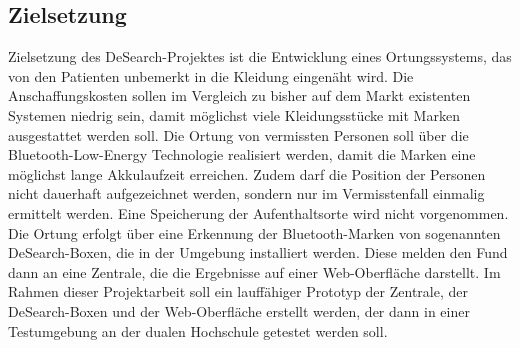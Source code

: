 \subsection{Zielsetzung}
Zielsetzung des DeSearch-Projektes ist die Entwicklung eines Ortungssystems, das von den Patienten unbemerkt in die Kleidung eingenäht wird. Die Anschaffungskosten sollen im Vergleich zu bisher auf dem Markt existenten Systemen niedrig sein, damit möglichst viele Kleidungsstücke mit Marken ausgestattet werden soll. Die Ortung von vermissten Personen soll über die Bluetooth-Low-Energy Technologie realisiert werden, damit die Marken eine möglichst lange Akkulaufzeit erreichen. Zudem darf die Position der Personen nicht dauerhaft aufgezeichnet werden, sondern nur im Vermisstenfall einmalig ermittelt werden. Eine Speicherung der Aufenthaltsorte wird nicht vorgenommen. Die Ortung erfolgt über eine Erkennung der Bluetooth-Marken von sogenannten DeSearch-Boxen, die in der Umgebung installiert werden. Diese melden den Fund dann an eine Zentrale, die die Ergebnisse auf einer Web-Oberfläche darstellt. Im Rahmen dieser Projektarbeit soll ein lauffähiger Prototyp der Zentrale, der DeSearch-Boxen und der Web-Oberfläche erstellt werden, der dann in einer Testumgebung an der dualen Hochschule getestet werden soll.
